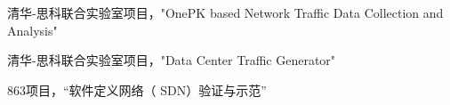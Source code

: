 \begin{resume}
\begin{enumerate}[{[}1{]}]
\item 清华-思科联合实验室项目，"OnePK based Network Traffic Data Collection and Analysis"
\item 清华-思科联合实验室项目，"Data Center Traffic Generator"
\item 863项目，“软件定义网络（ SDN）验证与示范”

\end{enumerate}
\end{resume}
